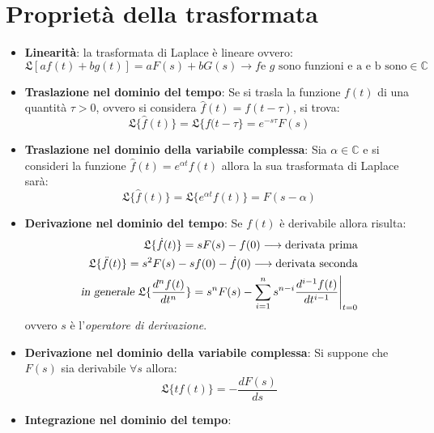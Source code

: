 \documentclass[a4paper]{report}
\begin{document}
\section {Propriet\`a della trasformata}
\begin{itemize}
\item{ \textbf{Linearit\`a}: la trasformata di Laplace \`e lineare ovvero: 
  \begin{equation}\label{eq:laplinear}
    \mathfrak{L}[af(t)+bg(t)]=aF(s)+bG(s) \longrightarrow \textrm{$f$
      e $g$ sono funzioni e a e b sono} \in \mathbb{C}
\end{equation}
}
\item{\textbf{Traslazione nel dominio del tempo}: Se si trasla la
  funzione $f(t)$ di una quantit\`a $\tau>0$, ovvero si considera 
  $\hat{f}(t)=f(t-\tau)$, si trova: 
\begin{equation}\label{eq:laptraslt}
  \mathfrak{L}\{\hat{f}(t)\} = \mathfrak{L}\{f(t-\tau\} = e^{-s\tau}F(s)
\end{equation}
}
\item{\textbf{Traslazione nel dominio della variabile complessa}: Sia
  $\alpha \in \mathbb{C}$ e si consideri la funzione
  $\hat{f}(t)=e^{\alpha t}f(t)$ allora la sua trasformata di Laplace sar\`a: 
  \begin{equation}\label{eq:laptrasls}
    \mathfrak{L}\{\hat{f}(t)\}=\mathfrak{L}\{e^{\alpha t}f(t)\}=F(s-\alpha)
  \end{equation}
}
\item{\textbf{Derivazione nel dominio del tempo}: Se $f(t)$ \`e
  derivabile allora risulta:
\begin{eqnarray}\label{eq:lapdert}
  \mathfrak{L}\{\dot f (t)\}=sF(s)-f(0) \longrightarrow \textrm{derivata prima} \\
  \mathfrak{L}\{\ddot f (t)\}=s^2F(s)-sf(0)-\dot f(0) \longrightarrow \textrm{derivata seconda} \\
  \textsl{in generale} ~\mathfrak{L}\{\frac{d^nf(t)}{dt^n}\}=s^nF(s) -
  \sum\limits_{i=1}^n s^{n-i} \frac{d^{i-1}f(t)}{dt^{i-1}}\Bigg |_{t=0}
\end{eqnarray}
ovvero $s$ \`e l'\emph{operatore di derivazione}.
}
\item{\textbf{Derivazione nel dominio della variabile complessa}: Si
  suppone che $F(s)$ sia derivabile $\forall s$ allora: 
\begin{equation}\label{eq:lapders}
  \mathfrak{L}\{tf(t)\}=-\frac{dF(s)}{ds}
\end{equation}
}
\item{\textbf{Integrazione nel dominio del tempo}: 
}
\end{itemize}
\end{document}
